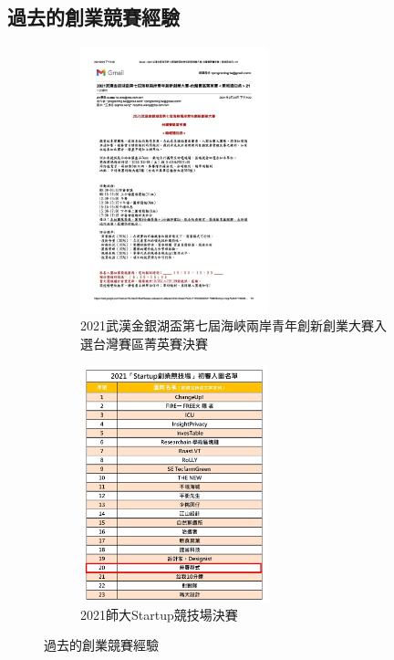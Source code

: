 \subsection{過去的創業競賽經驗}
\label{fig:Appendix-Competition}
\begin{figure}[H]
	\centering
	\begin{subfigure}{0.45\linewidth}
		\centering
		\includegraphics[width=0.6\textwidth]{images/competition-1.jpeg}
		\caption{2021武漢金銀湖盃第七屆海峽兩岸青年創新創業大賽入選台灣賽區菁英賽決賽}
		\label{fig:Competition-1}
	\end{subfigure}
	\begin{subfigure}{0.45\linewidth}
		\centering
		\includegraphics[width=0.6\textwidth]{images/competition-2.jpeg}
		\caption{2021師大Startup競技場決賽}
		\label{fig:Competition-2}
	\end{subfigure}
	\caption{過去的創業競賽經驗}
\end{figure}


